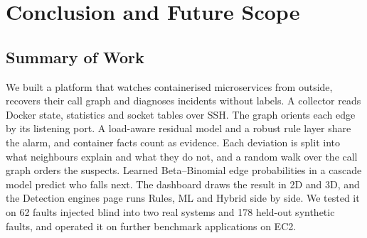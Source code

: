 \clearpage
\chapter[CONCLUSION AND FUTURE SCOPE]{Conclusion and Future Scope}
\label{ch:conclusion}

\section{Summary of Work}
We built a platform that watches containerised microservices from outside, recovers their call graph and diagnoses incidents without labels. A collector reads Docker state, statistics and socket tables over SSH. The graph orients each edge by its listening port. A load-aware residual model and a robust rule layer share the alarm, and container facts count as evidence. Each deviation is split into what neighbours explain and what they do not, and a random walk over the call graph orders the suspects. Learned Beta--Binomial edge probabilities in a cascade model predict who falls next. The dashboard draws the result in 2D and 3D, and the Detection engines page runs Rules, ML and Hybrid side by side. We tested it on 62 faults injected blind into two real systems and 178 held-out synthetic faults, and operated it on further benchmark applications on EC2.

